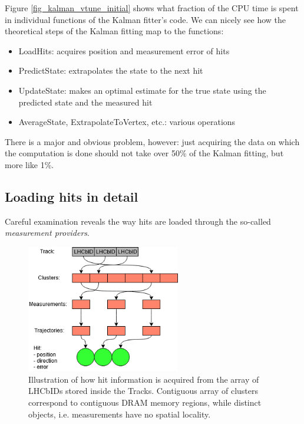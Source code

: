 \documentclass[12pt]{article}
\begin{document}
Figure \ref{fig_kalman_vtune_initial} shows what fraction of the CPU time is spent in individual functions of the Kalman fitter's code. We can nicely see how the theoretical steps of the Kalman fitting map to the functions:
\begin{itemize}
	\item LoadHits: acquires position and measurement error of hits
	\item PredictState: extrapolates the state to the next hit
	\item UpdateState: makes an optimal estimate for the true state using the predicted state and the measured hit
	\item AverageState, ExtrapolateToVertex, etc.: various operations
\end{itemize}
There is a major and obvious problem, however: just acquiring the data on which the computation is done should not take over 50\% of the Kalman fitting, but more like 1\%.	


\subsection{Loading hits in detail}

Careful examination reveals the way hits are loaded through the so-called \textit{measurement providers}.
	
\begin{figure}[H]
	\begin{center}
		\includegraphics[width=0.6\textwidth]{kalmanfit_loadhits_schematic}
	\end{center}
	\caption[Loading of track data from LHCbIDs]{Illustration of how hit information is acquired from the array of LHCbIDs stored inside the Tracks. Contiguous array of clusters correspond to contiguous DRAM memory regions, while distinct objects, i.e. measurements have no spatial locality.}
	\label{fig_kalmanfit_loadhits_schematic}
\end{figure}
\end{document}
